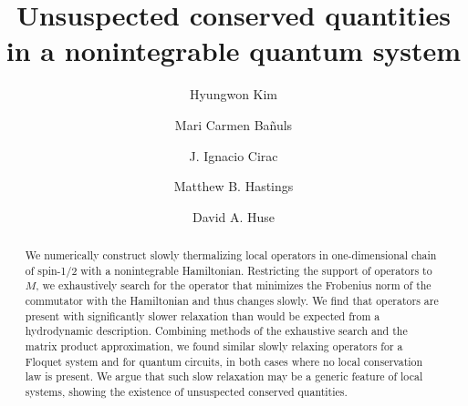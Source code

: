 \documentclass[twocolumn,superscriptaddress, prb]{revtex4-1}
\begin{document}
\title{Unsuspected conserved quantities in a nonintegrable quantum system}

\author{Hyungwon Kim}

\author{Mari Carmen Ba\~{n}uls}

\author{J. Ignacio Cirac}

\author{Matthew B. Hastings}

\author{David A. Huse}

\begin{abstract}
We numerically construct slowly thermalizing local operators in one-dimensional chain of spin-1/2 with a nonintegrable Hamiltonian.
Restricting the support of operators to $M$, we exhaustively search for the operator that minimizes the Frobenius norm of the commutator
with the Hamiltonian and thus changes slowly.  We find that operators are present with significantly slower relaxation than would be
expected from a hydrodynamic description. Combining methods of the exhaustive search and the matrix product approximation, we found
similar slowly relaxing operators for a Floquet system and for quantum circuits, in both cases where no local conservation law is present.
We argue that such slow relaxation may be a generic feature of local systems, showing the existence of unsuspected conserved quantities.
\end{abstract}

\pacs{}

\maketitle
\end{document}
